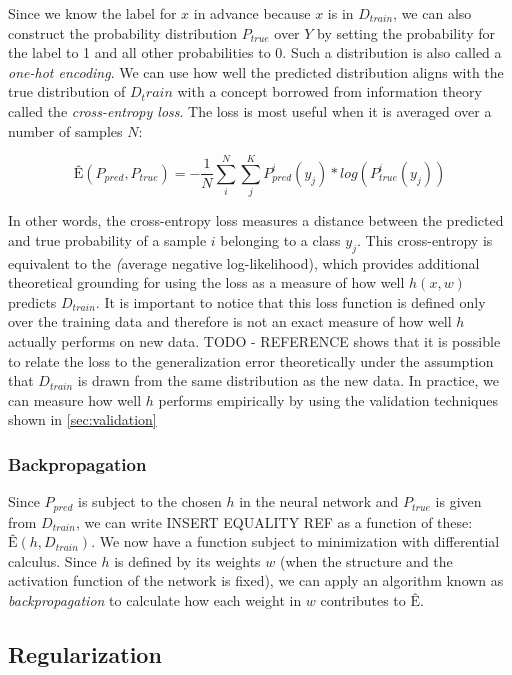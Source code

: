 Since we know the label for $x$ in advance because $x$ is in $D_{train}$, we can also construct the probability distribution $P_{true}$ over $Y$ by setting the probability for the label to 1 and all other probabilities to 0. Such a distribution is also called a \emph{one-hot encoding}. We can use how well the predicted distribution aligns with the true distribution of $D_train$ with a concept borrowed from information theory called the \emph{cross-entropy loss}. The loss is most useful when it is averaged over a number of samples $N$:

$$
Ê(P_{pred}, P_{true}) = - \frac{1}{N} \sum_i^N \sum_j^K P_{pred}^i(y_{j}) * log(P_{true}^i(y_{j}))
$$

In other words, the cross-entropy loss measures a distance between the predicted and true probability of a sample $i$ belonging to a class $y_j$.
This cross-entropy is equivalent to the \emph(average negative log-likelihood), which provides additional theoretical grounding for using the loss as a measure of how well $h(x,w)$ predicts $D_{train}$. %
It is important to notice that this loss function is defined only over the training data and therefore is not an exact measure of how well $h$ actually performs on new data. TODO - REFERENCE shows that it is possible to relate the loss to the generalization error  theoretically  under the assumption that $D_{train}$ is drawn from the same distribution as the new data. In practice, we can measure how well $h$ performs empirically by using the validation techniques shown in \autoref{sec:validation}

\subsubsection{Backpropagation}

Since $P_{pred}$ is subject to the chosen $h$ in the neural network and $P_{true}$ is given from $D_{train}$, we can write INSERT EQUALITY REF as a function of these: $Ê(h, D_{train})$. We now have a function subject to minimization with differential calculus. Since $h$ is defined by its weights $w$ (when the structure and the activation function of the network is fixed), we can apply an algorithm known as \emph{backpropagation} to calculate how each weight in $w$ contributes to $Ê$.  

\subsection{Regularization}
\label{sec:regularization}

